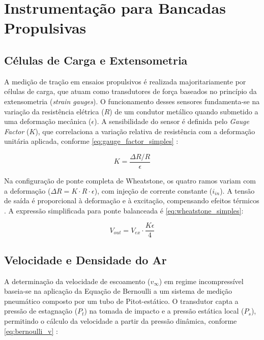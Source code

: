 \section{Instrumentação para Bancadas Propulsivas}

\subsection{Células de Carga e Extensometria}

A medição de tração em ensaios propulsivos é realizada majoritariamente por células de carga, que atuam como transdutores de força baseados no princípio da extensometria (\textit{strain gauges}). O funcionamento desses sensores fundamenta-se na variação da resistência elétrica ($R$) de um condutor metálico quando submetido a uma deformação mecânica ($\epsilon$). A sensibilidade do sensor é definida pelo \textit{Gauge Factor} ($K$), que correlaciona a variação relativa de resistência com a deformação unitária aplicada, conforme \eqref{eq:gauge_factor_simples} \cite{Figliola2019}:

\begin{equation}
    K = \frac{\Delta R / R}{\epsilon}
    \label{eq:gauge_factor_simples}
\end{equation}

Na configuração de ponte completa de Wheatstone, os quatro ramos variam com a deformação ($\Delta R = K \cdot R \cdot \epsilon$), com injeção de corrente constante ($i_{in}$). A tensão de saída é proporcional à deformação e à excitação, compensando efeitos térmicos \cite{Costa2021}. A expressão simplificada para ponte balanceada é \eqref{eq:wheatstone_simples}:

\begin{equation}
    V_{out} = V_{ex} \cdot \frac{K \epsilon}{4}
    \label{eq:wheatstone_simples}
\end{equation}


\subsection{Velocidade e Densidade do Ar}
\label{sec:velocidade_densidade_ar}

A determinação da velocidade de escoamento ($v_\infty$) em regime incompressível baseia-se na aplicação da Equação de Bernoulli a um sistema de medição pneumático composto por um tubo de Pitot-estático. O transdutor capta a pressão de estagnação ($P_t$) na tomada de impacto e a pressão estática local ($P_s$), permitindo o cálculo da velocidade a partir da pressão dinâmica, conforme \eqref{eq:bernoulli_v} \cite{Anderson2016}:

